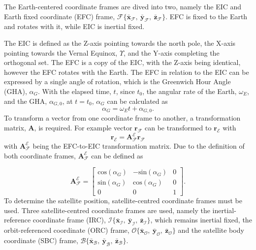 The Earth-centered coordinate frames are dived into two, namely the EIC and Earth fixed coordinate (EFC) frame, $\mathcal{F}\{\bar{\mathbf{x}}_{\mathcal{F}},~\bar{\mathbf{y}}_{\mathcal{F}},~\bar{\mathbf{z}}_{\mathcal{F}}\}$. EFC is fixed to the Earth and rotates with it, while EIC is inertial fixed.


The EIC is defined as the Z-axis pointing towards the north pole, the X-axis pointing towards the Vernal Equinox, $\Upsilon$, and the Y-axis completing the orthogonal set. The EFC is a copy of the EIC, with the Z-axis being identical, however the EFC rotates with the Earth. The EFC in relation to the EIC can be expressed by a single angle of rotation, which is the Greenwich Hour Angle (GHA), $\alpha_G$. With the elapsed time, $t$, since $t_0$, the angular rate of the Earth, $\omega_E$, and the GHA, $\alpha_{G,0}$, at $t = t_0$, $\alpha_G$ can be calculated as 
\begin{equation}
\alpha_G = \omega_Et + \alpha_{G,0}.
\end{equation}
To transform a vector from one coordinate frame to another, a transformation matrix, $\boldsymbol{A}$, is required. For example vector $\mathbf{r}_{\mathcal{F}}$ can be transformed to $\mathbf{r}_{\mathcal{E}}$ with 
\begin{equation}
\mathbf{r}_{\mathcal{E}} = \boldsymbol{A}^{\mathcal{E}}_{\mathcal{F}}\mathbf{r}_{\mathcal{F}}
\end{equation}
with $\boldsymbol{A}^{\mathcal{E}}_{\mathcal{F}}$ being the EFC-to-EIC transformation matrix. Due to the definition of both coordinate frames, $\boldsymbol{A}^{\mathcal{E}}_{\mathcal{F}}$ can be defined as

\begin{equation}
\boldsymbol{A}^{\mathcal{E}}_{\mathcal{F}} = 
\begin{bmatrix}
	\text{cos}(\alpha_G) & -\text{sin}(\alpha_G) & 0\\
	\text{sin}(\alpha_G) & \text{cos}(\alpha_G) & 0 \\
	0 & 0 & 1
\end{bmatrix}.
\end{equation}
To determine the satellite position, satellite-centred coordinate frames must be used. Three satellite-centred coordinate frames are used, namely the inertial-reference coordinate frame (IRC), $\mathcal{I}\{\bar{\mathbf{x}}_{\mathcal{I}},~\bar{\mathbf{y}}_{\mathcal{I}},~\bar{\mathbf{z}}_{\mathcal{I}}\}$,  which remains inertial fixed, the orbit-referenced coordinate (ORC) frame, $\mathcal{O}\{\bar{\mathbf{x}}_{\mathcal{O}},~\bar{\mathbf{y}}_{\mathcal{O}},~\bar{\mathbf{z}}_{\mathcal{O}}\}$ and the satellite body coordinate (SBC) frame, $\mathcal{B}\{\bar{\mathbf{x}}_{\mathcal{B}},~\bar{\mathbf{y}}_{\mathcal{B}},~\bar{\mathbf{z}}_{\mathcal{B}}\}$. 

